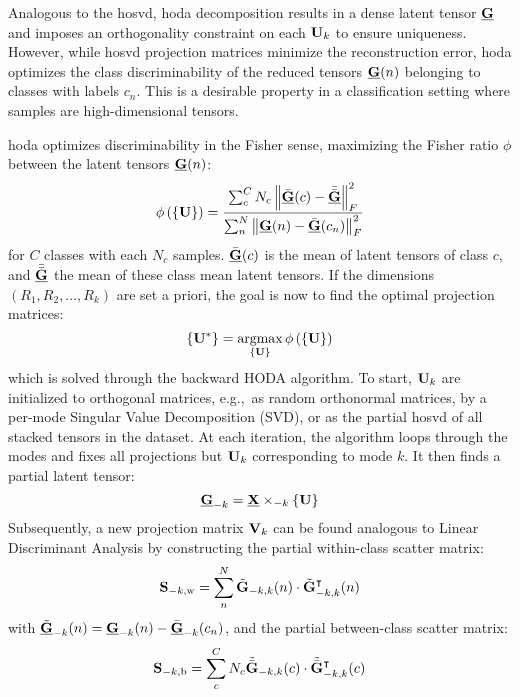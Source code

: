 \documentclass[twocolumn]{article}
\begin{document}
Analogous to the \ac{hosvd}, \ac{hoda} decomposition results in a dense latent
tensor $\ten{G}$ and imposes an orthogonality constraint on each $\mat{U}_k$ to ensure uniqueness.
However, while \ac{hosvd} projection matrices minimize the reconstruction error,
\ac{hoda} optimizes the class discriminability of the reduced tensors
$\ten{G}(n)$ belonging to classes with labels $c_n$.
This is a desirable property in a classification setting where samples are
high-dimensional tensors.

\Ac{hoda} optimizes discriminability in the Fisher sense, maximizing the Fisher
ratio $\phi$ between the latent tensors $\ten{G}(n)$:
\begin{equation}
	\phi\left(\left\{\mat{U}\right\}\right) = \frac{\sum_c^CN_c\left\|\bar{\ten{G}}(c)-\bar{\bar{\ten{G}}}\right\|_F^2}
	{\sum_n^N\left\|\ten{G}(n)-\bar{\ten{G}}(c_n)\right\|_F^2}
	\label{eq:fisher}
\end{equation}
for $C$ classes with each $N_c$ samples. $\bar{\ten{G}}(c)$ is the mean of
latent tensors of class $c$, and $\bar{\bar{\ten{G}}}$ the mean of
these class mean latent tensors.
If the dimensions $(R_1,R_2, \ldots,R_k)$ are set a priori, the goal is now to find the optimal projection matrices:
\begin{equation}
	\left\{\mat{U}^*\right\} =  \argmax_{\{\mat{U}\}}\phi\left(\left\{\mat{U}\right\}\right)
\end{equation}
which is solved through the backward HODA algorithm.
To start, $\mat{U}_k$ are initialized to orthogonal matrices, e.g.,\ as random
orthonormal matrices, by a per-mode Singular Value Decomposition (SVD),
or as the partial \ac{hosvd} of all stacked tensors in the dataset.
At each iteration, the algorithm loops through the modes and fixes all
projections but $\mat{U}_k$ corresponding to mode $k$.
It then finds a partial latent tensor:
\begin{equation}
	\ten{G}_{-k}=\ten{X}\mmprs{\mat{U}}{k}
\end{equation}
Subsequently, a new projection matrix $\mat{V}_k$ can be found analogous to Linear
Discriminant Analysis by constructing the partial within-class scatter matrix:
\begin{equation}
	\mat{S}_{-k,\text{w}} = \sum_n^N\tilde{\mat{G}}_{-k,k}(n)\cdot\tilde{\mat{G}}_{-k,k}^\intercal(n)
\end{equation}
with $\tilde{\ten{G}}_{-k}(n) = \ten{G}_{-k}(n) - \bar{\ten{G}}_{-k}(c_n)$,
and the partial between-class scatter matrix:
\begin{equation}
	\mat{S}_{-k,\text{b}} =
	\sum_c^CN_c\tilde{\bar{\mat{G}}}_{-k,k}(c)\cdot\tilde{\bar{\mat{G}}}_{-k,k}^\intercal(c)
\end{equation}
\end{document}
